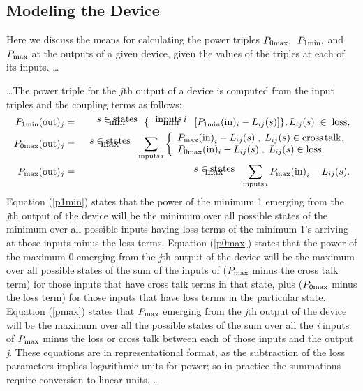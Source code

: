 \subsection{ Modeling the Device}
Here we discuss the means for calculating the power triples $ P_{0\rm
max},\kern.5em P_{1\rm min}, $ and $ P_{\rm max}$ at the outputs of a given
device, given the values of the triples at each of its inputs. \ldots

\ldots The power triple for the $j$th output of a device is computed from
the input triples and the coupling terms as follows:
\begin{eqnarray}
P_{1\rm min}({\rm out})_j & = & \begin{array}[t]{c} {\rm min} \\[-15pt]
{s\in\rm states} \end{array}\, \{ \,  \begin{array}[t]{c}{\rm min}
\\[-15pt] {\rm inputs}\, i \end{array} \;  [P_{1\rm min}({\rm in})_i -
L_{ij}(s)]\}, L_{ij}(s) \; \in \;  {\rm loss},\label{p1min} \\ P_{0\rm
max}({\rm out})_j & =& \begin{array}[t]{c}{\rm max} \\[-15pt] {s\in\rm
states} \end{array}\, \sum_{{\rm inputs}\, i}\left\{ \begin{array}{l}P_{\rm
max}{\rm (in)}_i - L_{ij}(s)\;  ,\; L_{ij}(s)\in {\rm cross\,
talk},\label{p0max} \\  P_{0\rm max}({\rm in})_i - L_{ij}(s)\; ,\;
L_{ij}(s)\in {\rm loss},   \end{array} \right. \\ P_{\rm max}({\rm out})_j
&=& \begin{array}[t]{c}{\rm max} \\[-15pt] {s\in\rm states} \end{array}\,
\sum_{{\rm inputs}\, i}  P_{\rm max}{\rm (in)}_i - L_{ij}(s) . \label{pmax}
\end{eqnarray}
Equation (\ref{p1min}) states that the power of the minimum 1 emerging from
the {\it j}th output of the device will be the minimum over all possible
states of the minimum over all possible inputs having loss terms of the
minimum 1's arriving at those inputs minus the loss terms. Equation
(\ref{p0max}) states that the power of the maximum 0 emerging from the {\it
j}th output of the device will be the maximum over all possible states of
the sum of the inputs of ($P_{\rm max} $ minus the cross talk term) for
those inputs that have cross talk terms in that state, plus ($P_{0\rm max}
$ minus the loss term) for those inputs that have loss terms in the
particular state.  Equation (\ref{pmax}) states that $ P_{\rm max} $
emerging from the {\it j}th output of the device will be the maximum over
all the possible states of the sum over all the {\it i} inputs of $ P_{\rm
max} $ minus the loss or cross talk between each of those inputs and the
output {\it j}.  These equations are in representational format, as the
subtraction of the loss parameters implies logarithmic units for power; so
in practice the summations require conversion to linear units.  \ldots

